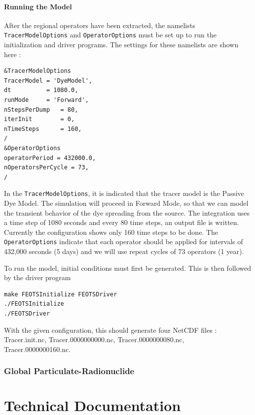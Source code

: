 \documentclass{softwaremanual}
\begin{document}
\subsection{Running the Model}
After the regional operators have been extracted, the namelists \texttt{TracerModelOptions} and \texttt{OperatorOptions} must be set up to run the initialization and driver programs. The settings for these namelists are shown here :
\begin{verbatim}
&TracerModelOptions
TracerModel = 'DyeModel',
dt          = 1080.0,
runMode     = 'Forward',
nStepsPerDump   = 80,
iterInit        = 0,
nTimeSteps      = 160,
/
&OperatorOptions
operatorPeriod = 432000.0,
nOperatorsPerCycle = 73,
/
\end{verbatim}
In the \texttt{TracerModelOptions}, it is indicated that the tracer model is the Passive Dye Model. The simulation will proceed in Forward Mode, so that we can model the transient behavior of the dye spreading from the source. The integration uses a time step of 1080 seconds and every 80 time steps, an output file is written. Currently the configuration shows only 160 time steps to be done. The \texttt{OperatorOptions} indicate that each operator should be applied for intervals of 432,000 seconds (5 days) and we will use repeat cycles of 73 operators (1 year).

To run the model, initial conditions must first be generated. This is then followed by the driver program
\begin{verbatim}
make FEOTSInitialize FEOTSDriver
./FEOTSInitialize
./FEOTSDriver
\end{verbatim}

With the given configuration, this should generate four NetCDF files : Tracer.init.nc, Tracer.0000000000.nc, Tracer.0000000080.nc, Tracer.0000000160.nc.



\section{Global Particulate-Radionuclide}


\part{Technical Documentation}
\end{document}

